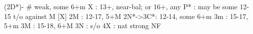 (2D*)- # weak, some 6+m
 X  : 13+, near-bal; or 16+, any
 P* : may be some 12-15 t/o against M [X]
 2M : 12-17, 5+M
 2N*->3C*: 12-14, some 6+m
 3m : 15-17, 5+m
 3M : 15-18, 6+M
 3N : s/o
 4X : nat strong NF